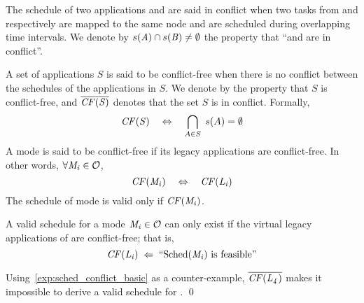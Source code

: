 The schedule of two applications \appA and \appB are said in conflict when two tasks from \appA and \appB respectively are mapped to the same node and are scheduled during overlapping time intervals.
We denote by $s(\mathit{A}) \cap s(\mathit{B}) \not= \emptyset$ the property that ``\appA and \appB are in conflict''.
%

\begin{definition}
A set of applications $S$ is said to be conflict-free when there is no conflict between the schedules of the applications in $S$. We denote by  the property that $S$ is conflict-free, and $\overline{\mathit{CF({S})}}$ denotes that the set $S$ is in conflict.
Formally,
\begin{equation*}
\mathit{CF({S})} \quad \Leftrightarrow  \quad \bigcap_{A \in S} \; s(A) = \emptyset
\end{equation*}
A mode is said to be conflict-free if its legacy applications are conflict-free. In other words, $\forall \mathit{M_{i}} \in \mathcal{O}$,
\begin{equation*}
\mathit{CF({\mathit{M_{i}}})} \quad \Leftrightarrow  \quad \mathit{CF({\mathit{L_{i}}})}
\end{equation*}
The schedule \sched{\modei} of mode \modei is valid only if $\mathit{CF({\mathit{M_{i}}})}$.
\end{definition}

\begin{corollary}
\label{cor:nec_precond}
	A valid schedule for a mode $\mathit{M_{i}} \in \mathcal{O}$ can only exist if the virtual legacy applications of \modei are conflict-free; that is,
	\begin{equation*}
	\mathit{CF({\mathit{L_{i}}})} \; \Leftarrow \; \text{``Sched(\ensuremath{\mathit{M_{i}}}) is feasible''}
	\end{equation*}
\end{corollary}

\proof Using~\cref{exp:sched_conflict_basic} as a counter-example, $\overline{\mathit{CF({\mathit{L_{4}}})}}$ makes it impossible to derive a valid schedule for .
\qed




